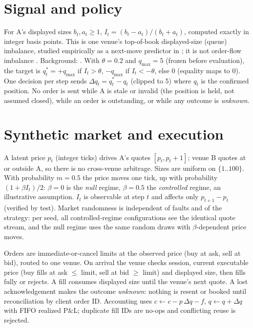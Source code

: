 \documentclass[10pt,twocolumn]{article}
\begin{document}
\section{Signal and policy}
For A's displayed sizes $b_t,a_t\ge 1$, $I_t=(b_t-a_t)/(b_t+a_t)$, computed exactly in integer basis
points. This is one venue's top-of-book displayed-size (queue) imbalance, studied empirically as a
next-move predictor in \cite{gb}; it is not order-flow imbalance \cite{cks}. Background: \cite{cjp}. With
$\theta=0.2$ and $q_{\max}=5$ (frozen before evaluation), the target is $q^*_t=+q_{\max}$ if
$I_t>\theta$, $-q_{\max}$ if $I_t<-\theta$, else $0$ (equality maps to $0$). One decision per step
sends $\Delta q_t=q^*_t-q_t$ (clipped to 5) where $q_t$ is the confirmed position. No order is sent
while A is stale or invalid (the position is held, not assumed closed), while an order is outstanding,
or while any outcome is \emph{unknown}.

\section{Synthetic market and execution}
A latent price $p_t$ (integer ticks) drives A's quotes $[p_t,p_t+1]$; venue B quotes at or outside A,
so there is no cross-venue arbitrage. Sizes are uniform on $\{1..100\}$. With probability $m=0.5$ the
price moves one tick, up with probability $(1+\beta I_t)/2$: $\beta=0$ is the \emph{null} regime,
$\beta=0.5$ the \emph{controlled} regime, an illustrative assumption. $I_t$ is observable at step $t$
and affects only $p_{t+1}-p_t$ (verified by test). Market randomness is independent of faults and of
the strategy: per seed, all controlled-regime configurations see the identical quote stream, and the
null regime uses the same random draws with $\beta$-dependent price moves.

Orders are immediate-or-cancel limits at the observed price (buy at ask, sell at bid), routed to one
venue. On arrival the venue checks session, current executable price (buy fills at ask $\le$ limit,
sell at bid $\ge$ limit) and displayed size, then fills fully or rejects. A fill consumes displayed
size until the venue's next quote. A lost acknowledgement makes the outcome \emph{unknown}: nothing
is resent or booked until reconciliation by client order ID. Accounting uses
$c\leftarrow c-p\,\Delta q-f$, $q\leftarrow q+\Delta q$ with FIFO realized P\&L; duplicate fill IDs
are no-ops and conflicting reuse is rejected.

\clearpage
\end{document}
